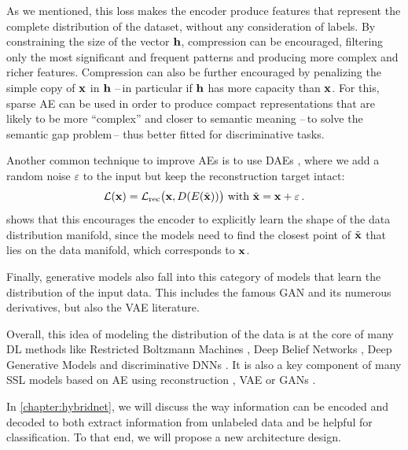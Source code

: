 As we mentioned, this loss makes the encoder produce features that represent the complete distribution of the dataset, without any consideration of labels. By constraining the size of the vector $\mathbf{h}$, compression can be encouraged, filtering only the most significant and frequent patterns and producing more complex and richer features. Compression can also be further encouraged by penalizing the simple copy of $\mathbf{x}$ in $\mathbf{h}$ --\,in particular if $\mathbf{h}$ has more capacity than $\mathbf{x}$. For this, sparse \ac{AE} can be used \citep{Ranzato2007,boureau2008sparse,glorot2011deep} in order to produce compact representations that are likely to be more ``complex'' and closer to semantic meaning --\,to solve the semantic gap problem\,-- thus better fitted for discriminative tasks.

Another common technique to improve \acp{AE} is to use \acfp{DAE} \citep{vincent2008extracting}, where we add a random noise $\varepsilon$ to the input but keep the reconstruction target intact:
\begin{equation}
  \mathcal{L}(\mathbf{x}) = \mathcal{L}_\mathrm{rec} \big(\mathbf{x}, D(E(\tilde{\mathbf{x}}))\big) \text{ with }\tilde{\mathbf{x}} = \mathbf{x} + \varepsilon\,.
\end{equation}
\citet{alain2014regularized} shows that this encourages the encoder to explicitly learn the shape of the data distribution manifold, since the models need to find the closest point of $\tilde{\mathbf{x}}$ that lies on the data manifold, which corresponds to $\mathbf{x}$.

Finally, generative models also fall into this category of models that learn the distribution of the input data. This includes the famous \acf{GAN} \citep{Goodfellow2014} and its numerous derivatives, but also the \acf{VAE} \citep{Kingma2013} literature.

Overall, this idea of modeling the distribution of the data is at the core of many \acf{DL} methods like Restricted Boltzmann Machines \citep{Larochelle2008}, Deep Belief Networks \citep{Goh_NIPS13}, Deep Generative Models \citep{kingma2014semi} and discriminative \acfp{DNN} \citep{Ranzato2008,Larochelle2008}. It is also a key component of many \ac{SSL} models based on \ac{AE} using reconstruction \citep{Weston2008,turian2010word}, \ac{VAE} \citep{Kingma2014} or \acp{GAN} \citep{Springenberg2015,Denton2017,Bodla2018}.

In \autoref{chapter:hybridnet}, we will discuss the way information can be encoded and decoded to both extract information from unlabeled data and be helpful for classification. To that end, we will propose a new architecture design.

